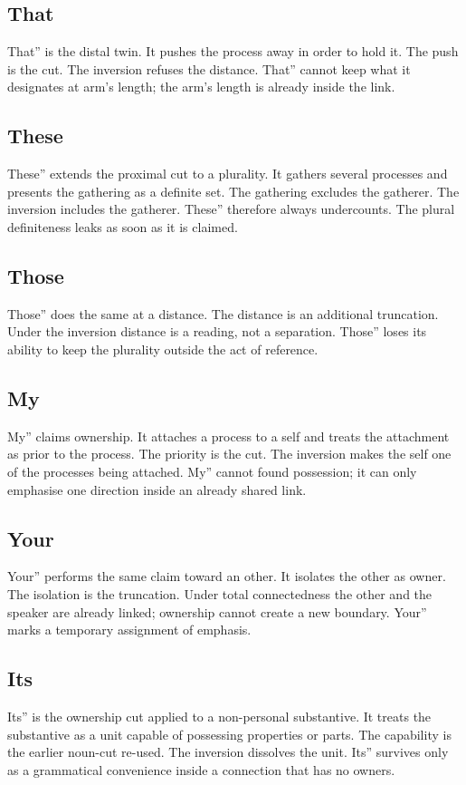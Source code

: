 \documentclass[11pt,a4paper]{article}
\begin{document}
\subsection{That} That'' is the distal twin. It pushes the process away in order to hold it. The push is the cut. The inversion refuses the distance. That'' cannot keep what it designates at arm’s length; the arm’s length is already inside the link.

\subsection{These} These'' extends the proximal cut to a plurality. It gathers several processes and presents the gathering as a definite set. The gathering excludes the gatherer. The inversion includes the gatherer. These'' therefore always undercounts. The plural definiteness leaks as soon as it is claimed.

\subsection{Those} Those'' does the same at a distance. The distance is an additional truncation. Under the inversion distance is a reading, not a separation. Those'' loses its ability to keep the plurality outside the act of reference.

\subsection{My} My'' claims ownership. It attaches a process to a self and treats the attachment as prior to the process. The priority is the cut. The inversion makes the self one of the processes being attached. My'' cannot found possession; it can only emphasise one direction inside an already shared link.

\subsection{Your} Your'' performs the same claim toward an other. It isolates the other as owner. The isolation is the truncation. Under total connectedness the other and the speaker are already linked; ownership cannot create a new boundary. Your'' marks a temporary assignment of emphasis.

\subsection{Its} Its'' is the ownership cut applied to a non-personal substantive. It treats the substantive as a unit capable of possessing properties or parts. The capability is the earlier noun-cut re-used. The inversion dissolves the unit. Its'' survives only as a grammatical convenience inside a connection that has no owners.
\end{document}
